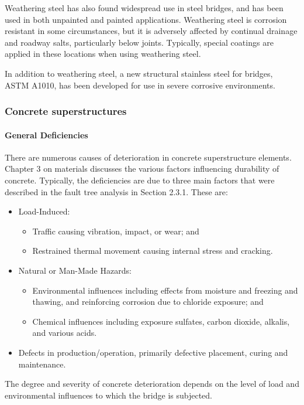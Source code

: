 Weathering steel has also found widespread use in steel bridges, and has been used in both unpainted and painted
applications. Weathering steel is corrosion resistant in some circumstances, but it is adversely affected by continual
drainage and roadway salts, particularly below joints. Typically, special coatings are applied in these locations when
using weathering steel.

In addition to weathering steel, a new structural stainless steel for bridges, ASTM A1010, has been developed for
use in severe corrosive environments.

\subsubsection{Concrete superstructures}
\paragraph{General Deficiencies}
There are numerous causes of deterioration in concrete superstructure elements. Chapter 3 on materials discusses
the various factors influencing durability of concrete. Typically, the deficiencies are due to three main factors that
were described in the fault tree analysis in Section 2.3.1. These are:
\begin{itemize}
  \item Load-Induced:
  \begin{itemize}
    \item Traffic causing vibration, impact, or wear; and
    \item Restrained thermal movement causing internal stress and cracking.
  \end{itemize}
  \item Natural or Man-Made Hazards:
  \begin{itemize}
    \item Environmental influences including effects from moisture and freezing and thawing, and reinforcing
    corrosion due to chloride exposure; and
    \item Chemical influences including exposure sulfates, carbon dioxide, alkalis, and various acids.
  \end{itemize}
  \item Defects in production/operation, primarily defective placement, curing and maintenance.
\end{itemize}
The degree and severity of concrete deterioration depends on the level of load and environmental influences to which the bridge is subjected.

